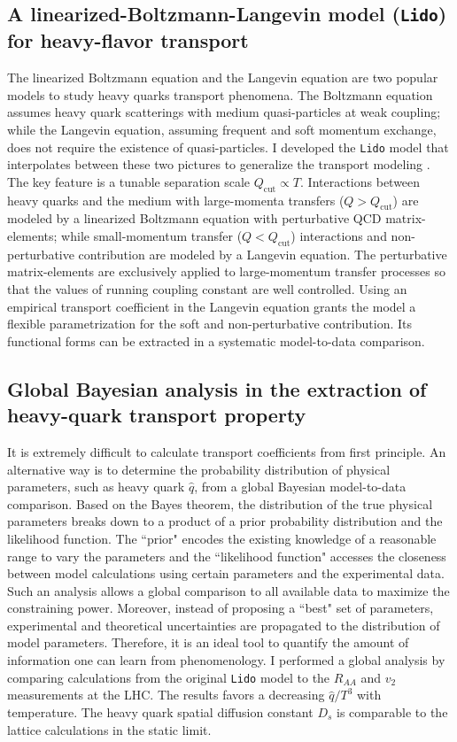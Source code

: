 \documentclass[12pt,a4paper]{revtex4-1}
\begin{document}
\subsection*{A linearized-Boltzmann-Langevin model ({\tt Lido}) for heavy-flavor transport}
The linearized Boltzmann equation and the Langevin equation are two popular models to study heavy quarks transport phenomena.
The Boltzmann equation assumes heavy quark scatterings with medium quasi-particles at weak coupling; while the Langevin equation, assuming frequent and soft momentum exchange, does not require the existence of quasi-particles.
I developed the {\tt Lido} model that interpolates between these two pictures to generalize the transport modeling \cite{Ke:2018tsh, Ke:2018jem}.
The key feature is a tunable separation scale $Q_{\textrm{cut}}\propto T$. Interactions between heavy quarks and the medium with large-momenta transfers ($Q > Q_{\textrm{cut}}$) are modeled by a linearized Boltzmann equation with perturbative QCD matrix-elements; while small-momentum transfer ($Q < Q_{\textrm{cut}}$) interactions and non-perturbative contribution are modeled by a Langevin equation. 
The perturbative matrix-elements are exclusively applied to large-momentum transfer processes so that the values of running coupling constant  are well controlled. 
Using an empirical transport coefficient in the Langevin equation grants the model a flexible parametrization for the soft and non-perturbative contribution. 
Its functional forms can be extracted in a systematic model-to-data comparison.

\subsection*{Global Bayesian analysis in the extraction of heavy-quark transport property}
It is extremely difficult to calculate transport coefficients from first principle. 
An alternative way is to determine the probability distribution of physical parameters, such as heavy quark $\hat{q}$, from a global Bayesian model-to-data comparison.
Based on the Bayes theorem, the distribution of the true physical parameters breaks down to a product of a prior probability distribution and the likelihood function.
The ``prior" encodes the existing knowledge of a reasonable range to vary the parameters and the ``likelihood function" accesses the closeness between model calculations using certain parameters and the experimental data.
Such an analysis allows a global comparison to all available data to maximize the constraining power.
Moreover, instead of proposing a ``best" set of parameters, experimental and theoretical uncertainties are propagated to the distribution of model parameters.
Therefore, it is an ideal tool to quantify the amount of information one can learn from phenomenology.
I performed a global analysis by comparing calculations from the original {\tt Lido} model to the $R_{AA}$ and $v_{2}$ measurements at the LHC. 
The results favors a decreasing $\hat{q}/T^3$ with temperature.
The heavy quark spatial diffusion constant $D_s$ is comparable to the lattice calculations in the static limit.
\end{document}
